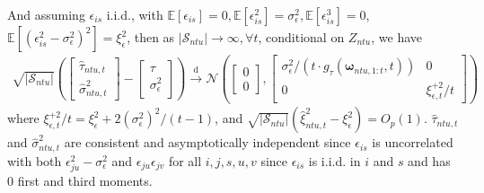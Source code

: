 \documentclass[twoside]{article}
\begin{document}
And assuming $\epsilon_{is}$ i.i.d., with $\mathbb{E}\left[\epsilon_{is}\right]=0,\mathbb{E}\left[\epsilon_{is}^2\right]=\sigma^2_{\epsilon},\mathbb{E}\left[\epsilon_{is}^3\right]=0$, $\mathbb{E}\left[\left( \epsilon^2_{is}-\sigma^2_{\epsilon} \right)^2\right] = \xi^2_{\epsilon}$, then as $\left\vert \mathcal{S}_{ntu} \right\vert \rightarrow \infty ,\forall t$, conditional on $Z_{ntu}$, we have 
\begin{align}
    \sqrt{\left\vert \mathcal{S}_{ntu} \right\vert} \left( \begin{bmatrix}
        \hat{\tau}_{ntu,t}\\
        \hat{\sigma}^2_{ntu,t}
    \end{bmatrix} - \begin{bmatrix}
        {\tau} \\
        {\sigma}^2_{\epsilon}
    \end{bmatrix} \right) \xrightarrow{\mathrm{d}} \mathcal{N} \left( \begin{bmatrix}
        0\\
        0
    \end{bmatrix}, \begin{bmatrix}
        \sigma^2_{\epsilon}/\left(t\cdot g_{\tau}\left(\boldsymbol{\omega}_{ntu,1:t},t\right)\right) & 0 \\
        0 & \xi^{+2}_{\epsilon,t}/t
    \end{bmatrix}  \right)
\end{align}
where $\xi^{+2}_{\epsilon,t}/t = \xi^2_{\epsilon} + 2 (\sigma^2_{\epsilon})^2/(t-1)$, and $\sqrt{\left\vert \mathcal{S}_{ntu} \right\vert} \left(\hat{\xi}^2_{ntu,t}-\xi^2_{\epsilon}\right) = O_p(1) $. $\hat{\tau}_{ntu,t}$ and $\hat{\sigma}^2_{ntu,t}$ are consistent and asymptotically independent since $\epsilon_{is}$ is uncorrelated with both $\epsilon^2_{ju}-\sigma^2_{\epsilon}$ and $\epsilon_{ju}\epsilon_{jv}$ for all $i,j,s,u,v$ since $\epsilon_{is}$ is i.i.d. in $i$ and $s$ and has 0 first and third moments.
\end{document}
